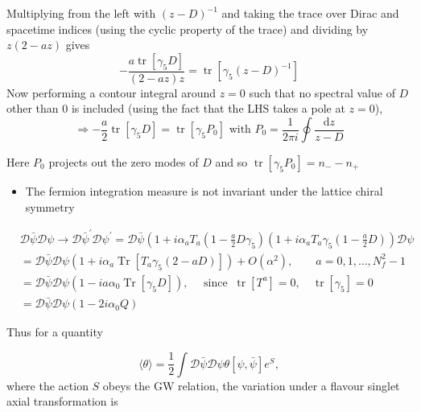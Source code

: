 Multiplying from the left with \((z-D)^{-1}\) and taking the trace over Dirac and spacetime indices (using the cyclic property of the trace) and dividing by \(z(2-a z)\) gives
\begin{equation}
    -\frac{a\operatorname{tr}[\gamma_5 D]}{(2-az)z} = \operatorname{tr}[\gamma_5(z-D)^{-1}]
\end{equation}
Now performing a contour integral around $z=0$ such that no spectral value of $D$ other than $0$ is included (using the fact that the LHS takes a pole at $z=0$),
\begin{equation}
    \Rightarrow -\frac{a}{2}\operatorname{tr}[\gamma_5 D] = \operatorname{tr}[\gamma_5 P_0]\text{ with }P_0 = \frac{1}{2 \pi i}\oint \frac{\text{d}z}{z - D}
\end{equation}

Here $P_0$ projects out the zero modes of $D$ and so $\operatorname{tr}[\gamma_5 P_0] = n_- - n_+$

\begin{itemize}
  \item The fermion integration measure is not invariant under the lattice chiral symmetry
\end{itemize}

\begin{equation}
\begin{aligned}
& \mathcal{D} \bar{\psi} \mathcal{D} \psi \rightarrow \mathcal{D} \bar{\psi}^{\prime} \mathcal{D} \psi^{\prime}=\mathcal{D} \bar{\psi}\left(1+i \alpha_{a} T_{a}\left(1-\frac{a}{2} D \gamma_{5}\right)\left(1+i \alpha_{a} T_{a} \gamma_{5}\left(1-\frac{a}{2} D\right)\right) \mathcal{D} \psi\right. \\
& =\mathcal{D} \bar{\psi} \mathcal{D} \psi\left(1+i \alpha_{a} \operatorname{Tr}\left[T_{a} \gamma_{5}(2-a D)\right]\right)+O\left(\alpha^{2}\right), \qquad a=0,1, \ldots, N_{f}^{2}-1 \\
& =\mathcal{D} \bar{\psi} \mathcal{D} \psi\left(1 - i a \alpha_{0} \operatorname{Tr}\left[\gamma_{5} D\right]\right), \quad\text{ since }\ \operatorname{tr}\left[T^{a}\right]=0, \quad\operatorname{tr}\left[\gamma_{5}\right]=0 \\
& =\mathcal{D} \bar{\psi} \mathcal{D} \psi\left(1-2 i \alpha_{0} Q\right)
\end{aligned}
\end{equation}

Thus for a quantity

\begin{equation}
\langle\theta\rangle=\frac{1}{2} \int \mathcal{D} \bar{\psi}\mathcal{D}\psi \theta[\psi, \bar{\psi}] e^{S},
\end{equation}
where the action $S$ obeys the GW relation, the variation under a flavour singlet axial transformation is

